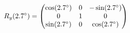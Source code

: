 \documentclass[preview]{standalone}
\begin{document}
\begin{align*}
\special{dvisvgm:raw <g id='unique000'>}R_y(2.7^\circ) = \begin{pmatrix} \cos(2.7^\circ) & 0 & -\sin(2.7^\circ) \\ 0 & 1 & 0 \\ \sin(2.7^\circ) & 0 & \cos(2.7^\circ) \end{pmatrix}\special{dvisvgm:raw </g>}
\end{align*}
\end{document}
